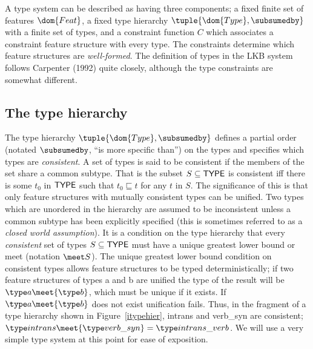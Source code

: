 \documentclass[12pt]{report}
\begin{document}
A type system
can be described as having three components; a fixed finite set of features
$\dom{Feat}$, a fixed type hierarchy $\tuple{\dom{Type}, \subsumedby}$
with a finite set of
types, and a constraint function $C$ which associates a constraint
feature 
structure with
every type.
The constraints determine which feature structures are {\em well-formed}.
The definition of types in the LKB system follows Carpenter (1992)
quite closely, although the type constraints are somewhat different.

\subsection{The type hierarchy}
\label{formthier}

The type hierarchy $\tuple{\dom{Type}, \subsumedby}$
defines a partial order (notated $\subsumedby$,
``is more specific than'')
on the types and specifies
which types are {\em consistent}.
A set of types is said to be consistent if the members of the 
set share a common subtype.
That is the subset $S\subseteq {\sf TYPE}$ is
consistent
iff there is some $t_{0}$ in  ${\sf TYPE}$ such that 
$t_{0} \sqsubseteq t $ for any $t$ in $S$.
The significance of this is that only feature structures with
mutually consistent types can be unified.  Two types which are
unordered in the hierarchy are assumed to be inconsistent
unless a common subtype has been explicitly specified (this is sometimes
referred to as a {\em closed world assumption}).
It is a condition on the type hierarchy that
every {\em consistent} set of types  $S\subseteq {\sf TYPE}$
must have a unique greatest lower bound or
meet (notation  $\meet S$). 
The unique greatest lower bound condition on consistent types
allows feature structures
to be typed deterministically; if two feature structures of types
{\type a}
and {\type b} are unified the type of the result will be 
${\type a} \meet {\type b} $,
which must
be unique if it exists.  If ${\type a} \meet {\type b}$ 
does not exist unification fails.  Thus, in the fragment of a type
hierarchy shown in Figure~\ref{itypehier}, {\type intrans} and 
{\type verb\_syn} are
consistent; ${\type intrans} \meet {\type verb\_syn} = {\type
intrans\_verb}$.
We will use a very simple type system at this point for
ease of exposition.
\setlength{\unitlength}{1.2in}
\end{document}
